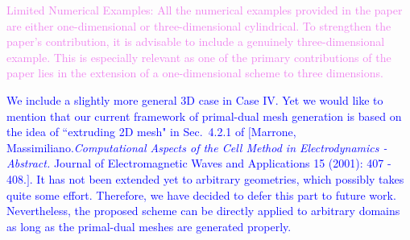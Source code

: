 \documentclass[12pt]{journalrebuttal}
\begin{document}
\begin{revcomment}
    \textcolor{violet}{
    Limited Numerical Examples: All the numerical examples provided in the paper
    are either one-dimensional or three-dimensional cylindrical. To strengthen the paper's 
    contribution,
    it is advisable to include a genuinely three-dimensional example.
    This is especially relevant as one of the primary contributions of the paper lies in the
    extension of a one-dimensional scheme to three dimensions.
    }
\end{revcomment}
\begin{response}
    \textcolor{blue}{
    We include a slightly more general 3D case in Case IV. Yet we would like to mention that 
    our current framework of primal-dual mesh generation is based on the idea of
    ``extruding 2D mesh" in Sec.~4.2.1 of
    $[$Marrone, Massimiliano.\emph{Computational Aspects of the Cell Method in Electrodynamics - 
    Abstract.} Journal of Electromagnetic Waves and Applications 15 (2001): 407 - 408.$]$.
    It has not been extended yet to arbitrary geometries, which possibly takes quite some effort.
    Therefore, we have decided to defer this part to future work. Nevertheless,
    the proposed scheme can be directly applied to arbitrary domains
    as long as the primal-dual meshes are generated properly.
    }
\end{response} 

\makerule
\end{document}
